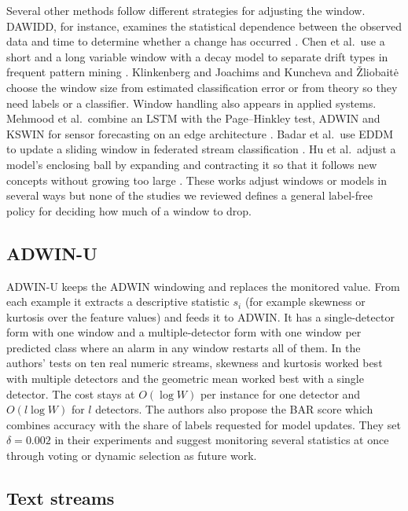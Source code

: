 \documentclass[conference]{IEEEtran}
\begin{document}
Several other methods follow different strategies for adjusting the window. DAWIDD, for instance, examines the statistical dependence between the observed data and time to determine whether a change has occurred \cite{hinder2020}. Chen et al.\ use a short and a long variable window with a decay model to separate drift types in frequent pattern mining \cite{chen2024}. Klinkenberg and Joachims \cite{klinkenberg2000} and Kuncheva and \v{Z}liobait\.{e} \cite{kuncheva2009} choose the window size from estimated classification error or from theory so they need labels or a classifier. Window handling also appears in applied systems. Mehmood et al.\ combine an LSTM with the Page--Hinkley test, ADWIN and KSWIN for sensor forecasting on an edge architecture \cite{mehmood2024}. Badar et al.\ use EDDM to update a sliding window in federated stream classification \cite{badar2023}. Hu et al.\ adjust a model's enclosing ball by expanding and contracting it so that it follows new concepts without growing too large \cite{hu2024}. These works adjust windows or models in several ways but none of the studies we reviewed defines a general label-free policy for deciding how much of a window to drop.

\subsection{ADWIN-U}

ADWIN-U \cite{assis2025} keeps the ADWIN windowing and replaces the monitored value. From each example it extracts a descriptive statistic $s_i$ (for example skewness or kurtosis over the feature values) and feeds it to ADWIN. It has a single-detector form with one window and a multiple-detector form with one window per predicted class where an alarm in any window restarts all of them. In the authors' tests on ten real numeric streams, skewness and kurtosis worked best with multiple detectors and the geometric mean worked best with a single detector. The cost stays at $O(\log W)$ per instance for one detector and $O(l\log W)$ for $l$ detectors. The authors also propose the BAR score which combines accuracy with the share of labels requested for model updates. They set $\delta=0.002$ in their experiments and suggest monitoring several statistics at once through voting or dynamic selection as future work.

\subsection{Text streams}
\end{document}
